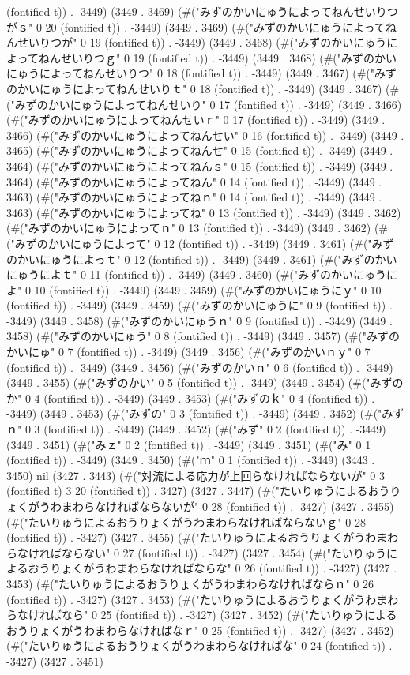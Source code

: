 (fontified t)) . -3449) (3449 . 3469) (#("みずのかいにゅうによってねんせいりつがｓ" 0 20 (fontified t)) . -3449) (3449 . 3469) (#("みずのかいにゅうによってねんせいりつが" 0 19 (fontified t)) . -3449) (3449 . 3468) (#("みずのかいにゅうによってねんせいりつｇ" 0 19 (fontified t)) . -3449) (3449 . 3468) (#("みずのかいにゅうによってねんせいりつ" 0 18 (fontified t)) . -3449) (3449 . 3467) (#("みずのかいにゅうによってねんせいりｔ" 0 18 (fontified t)) . -3449) (3449 . 3467) (#("みずのかいにゅうによってねんせいり" 0 17 (fontified t)) . -3449) (3449 . 3466) (#("みずのかいにゅうによってねんせいｒ" 0 17 (fontified t)) . -3449) (3449 . 3466) (#("みずのかいにゅうによってねんせい" 0 16 (fontified t)) . -3449) (3449 . 3465) (#("みずのかいにゅうによってねんせ" 0 15 (fontified t)) . -3449) (3449 . 3464) (#("みずのかいにゅうによってねんｓ" 0 15 (fontified t)) . -3449) (3449 . 3464) (#("みずのかいにゅうによってねん" 0 14 (fontified t)) . -3449) (3449 . 3463) (#("みずのかいにゅうによってねｎ" 0 14 (fontified t)) . -3449) (3449 . 3463) (#("みずのかいにゅうによってね" 0 13 (fontified t)) . -3449) (3449 . 3462) (#("みずのかいにゅうによってｎ" 0 13 (fontified t)) . -3449) (3449 . 3462) (#("みずのかいにゅうによって" 0 12 (fontified t)) . -3449) (3449 . 3461) (#("みずのかいにゅうによっｔ" 0 12 (fontified t)) . -3449) (3449 . 3461) (#("みずのかいにゅうによｔ" 0 11 (fontified t)) . -3449) (3449 . 3460) (#("みずのかいにゅうによ" 0 10 (fontified t)) . -3449) (3449 . 3459) (#("みずのかいにゅうにｙ" 0 10 (fontified t)) . -3449) (3449 . 3459) (#("みずのかいにゅうに" 0 9 (fontified t)) . -3449) (3449 . 3458) (#("みずのかいにゅうｎ" 0 9 (fontified t)) . -3449) (3449 . 3458) (#("みずのかいにゅう" 0 8 (fontified t)) . -3449) (3449 . 3457) (#("みずのかいにゅ" 0 7 (fontified t)) . -3449) (3449 . 3456) (#("みずのかいｎｙ" 0 7 (fontified t)) . -3449) (3449 . 3456) (#("みずのかいｎ" 0 6 (fontified t)) . -3449) (3449 . 3455) (#("みずのかい" 0 5 (fontified t)) . -3449) (3449 . 3454) (#("みずのか" 0 4 (fontified t)) . -3449) (3449 . 3453) (#("みずのｋ" 0 4 (fontified t)) . -3449) (3449 . 3453) (#("みずの" 0 3 (fontified t)) . -3449) (3449 . 3452) (#("みずｎ" 0 3 (fontified t)) . -3449) (3449 . 3452) (#("みず" 0 2 (fontified t)) . -3449) (3449 . 3451) (#("みｚ" 0 2 (fontified t)) . -3449) (3449 . 3451) (#("み" 0 1 (fontified t)) . -3449) (3449 . 3450) (#("ｍ" 0 1 (fontified t)) . -3449) (3443 . 3450) nil (3427 . 3443) (#("対流による応力が上回らなければならないが" 0 3 (fontified t) 3 20 (fontified t)) . 3427) (3427 . 3447) (#("たいりゅうによるおうりょくがうわまわらなければならないが" 0 28 (fontified t)) . -3427) (3427 . 3455) (#("たいりゅうによるおうりょくがうわまわらなければならないｇ" 0 28 (fontified t)) . -3427) (3427 . 3455) (#("たいりゅうによるおうりょくがうわまわらなければならない" 0 27 (fontified t)) . -3427) (3427 . 3454) (#("たいりゅうによるおうりょくがうわまわらなければならな" 0 26 (fontified t)) . -3427) (3427 . 3453) (#("たいりゅうによるおうりょくがうわまわらなければならｎ" 0 26 (fontified t)) . -3427) (3427 . 3453) (#("たいりゅうによるおうりょくがうわまわらなければなら" 0 25 (fontified t)) . -3427) (3427 . 3452) (#("たいりゅうによるおうりょくがうわまわらなければなｒ" 0 25 (fontified t)) . -3427) (3427 . 3452) (#("たいりゅうによるおうりょくがうわまわらなければな" 0 24 (fontified t)) . -3427) (3427 . 3451) 